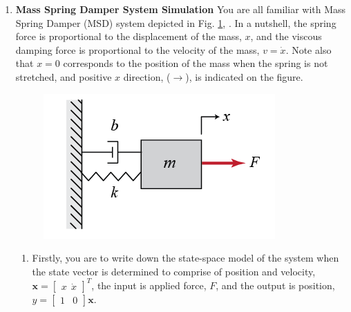 \documentclass[12pt]{article}
\theoremstyle{plain}
\theoremstyle{definition}
\begin{document}
	\begin{enumerate}	
	\item \textbf{Mass Spring Damper System Simulation}
	You are all familiar with Mass Spring Damper (MSD) system depicted in Fig. \ref{fig:MSD}, \cite{EE302}. In a nutshell, the spring force is proportional to the displacement of the mass, $x$, and the viscous damping force is proportional to the velocity of the mass, $v=\dot{x}$. Note also that $x=0$ corresponds to the position of the mass when the spring is not stretched, and positive $x$ direction, ($\longrightarrow$), is indicated on the figure.
	
	\begin{figure}[!htb]
		\centering
		\includegraphics[width=.4\textwidth]{Figures/MassSprinDamper.png}
		\caption{}
		\centering
		\label{fig:MSD}
	\end{figure}

	\begin{enumerate}
		\item Firstly, you are to write down the state-space model of the system when the state vector is determined to comprise of position and velocity, $\mathbf{x} = \left[ \begin{array}{c} x\ \  \dot{x} \end{array}\right]^T$, the input is applied force, $F$, and the output is position, $y = \left[ \begin{array}{cc} 1 & 0 \end{array} \right] \mathbf{x}$.
		


\end{enumerate}
\end{enumerate}
\end{document}
